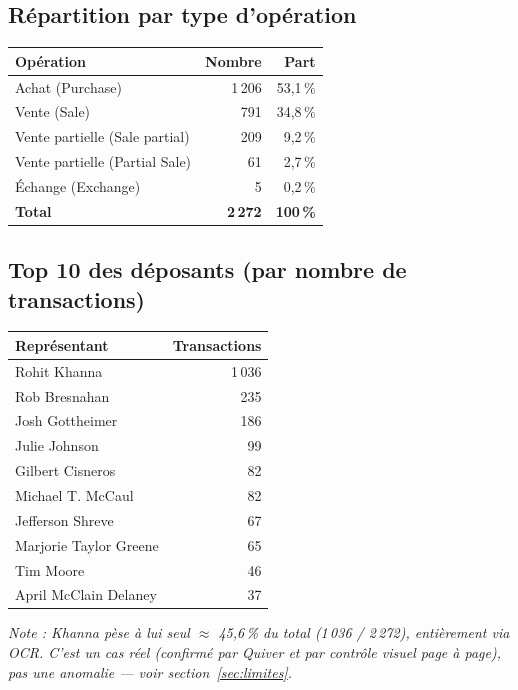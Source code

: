 \documentclass[11pt,a4paper]{article}
\begin{document}
\subsection*{Répartition par type d'opération}
\begin{center}
\begin{tabular}{@{}l r r@{}}
\toprule
\textbf{Opération} & \textbf{Nombre} & \textbf{Part} \\
\midrule
Achat (Purchase) & 1\,206 & 53,1\,\% \\
Vente (Sale) & 791 & 34,8\,\% \\
Vente partielle (Sale partial) & 209 & 9,2\,\% \\
Vente partielle (Partial Sale) & 61 & 2,7\,\% \\
Échange (Exchange) & 5 & 0,2\,\% \\
\midrule
\textbf{Total} & \textbf{2\,272} & \textbf{100\,\%} \\
\bottomrule
\end{tabular}
\end{center}

\subsection*{Top 10 des déposants (par nombre de transactions)}
\begin{center}
\begin{tabular}{@{}l r@{}}
\toprule
\textbf{Représentant} & \textbf{Transactions} \\
\midrule
Rohit Khanna & 1\,036 \\
Rob Bresnahan & 235 \\
Josh Gottheimer & 186 \\
Julie Johnson & 99 \\
Gilbert Cisneros & 82 \\
Michael T. McCaul & 82 \\
Jefferson Shreve & 67 \\
Marjorie Taylor Greene & 65 \\
Tim Moore & 46 \\
April McClain Delaney & 37 \\
\bottomrule
\end{tabular}
\end{center}
\noindent\footnotesize\emph{Note : Khanna pèse à lui seul $\approx$ 45,6\,\% du total (1\,036 / 2\,272),
entièrement via OCR. C'est un cas réel (confirmé par Quiver et par contrôle visuel page à page),
pas une anomalie --- voir section~\ref{sec:limites}.}\normalsize
\end{document}
